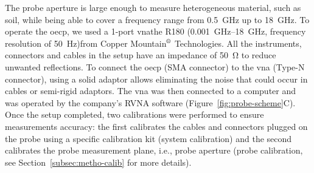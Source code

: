 The probe aperture is large enough to measure heterogeneous material, such as soil, while being able to cover a frequency range from \SI{0.5}{\giga\hertz} up to \SI{18}{\giga\hertz}.
To operate the \ac{oecp}, we used a 1-port \ac{vna}\textemdash the R180 (\SIrange{0.001}{18}{\giga\hertz}, frequency resolution of \qty{50}{\hertz})\textemdash from Copper Mountain\(^\text{\textregistered}\) Technologies.
All the instruments, connectors and cables in the setup have an impedance of \SI{50}{\ohm} to reduce unwanted reflections.
To connect the \ac{oecp} (SMA connector) to the \ac{vna} (Type-N connector), using a solid adaptor allows eliminating the noise that could occur in cables or semi-rigid adaptors.
The \ac{vna} was then connected to a computer and was operated by the company's RVNA software (Figure~\ref{fig:probe-scheme}C).
Once the setup completed, two calibrations were performed to ensure measurements accuracy: the first calibrates the cables and connectors plugged on the probe using a specific calibration kit (system calibration) and the second calibrates the probe measurement plane, i.e., probe aperture (probe calibration, see Section~\ref{subsec:metho-calib} for more details).

